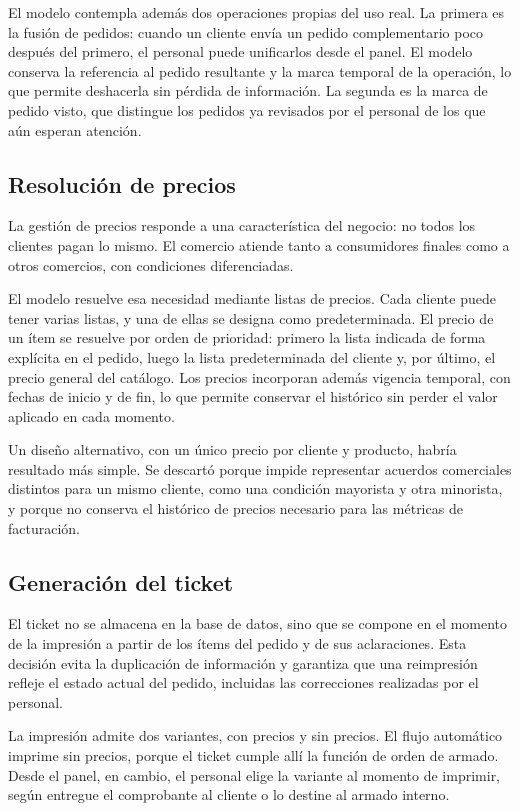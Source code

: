 El modelo contempla además dos operaciones propias del uso real. La primera es la fusión de pedidos: cuando un cliente envía un pedido complementario poco después del primero, el personal puede unificarlos desde el panel. El modelo conserva la referencia al pedido resultante y la marca temporal de la operación, lo que permite deshacerla sin pérdida de información. La segunda es la marca de pedido visto, que distingue los pedidos ya revisados por el personal de los que aún esperan atención.

\subsection{Resolución de precios}
\label{subsec:precios}

La gestión de precios responde a una característica del negocio: no todos los clientes pagan lo mismo. El comercio atiende tanto a consumidores finales como a otros comercios, con condiciones diferenciadas.

El modelo resuelve esa necesidad mediante listas de precios. Cada cliente puede tener varias listas, y una de ellas se designa como predeterminada. El precio de un ítem se resuelve por orden de prioridad: primero la lista indicada de forma explícita en el pedido, luego la lista predeterminada del cliente y, por último, el precio general del catálogo. Los precios incorporan además vigencia temporal, con fechas de inicio y de fin, lo que permite conservar el histórico sin perder el valor aplicado en cada momento.

Un diseño alternativo, con un único precio por cliente y producto, habría resultado más simple. Se descartó porque impide representar acuerdos comerciales distintos para un mismo cliente, como una condición mayorista y otra minorista, y porque no conserva el histórico de precios necesario para las métricas de facturación.

\subsection{Generación del ticket}
\label{subsec:ticket}

El ticket no se almacena en la base de datos, sino que se compone en el momento de la impresión a partir de los ítems del pedido y de sus aclaraciones. Esta decisión evita la duplicación de información y garantiza que una reimpresión refleje el estado actual del pedido, incluidas las correcciones realizadas por el personal.

La impresión admite dos variantes, con precios y sin precios. El flujo automático imprime sin precios, porque el ticket cumple allí la función de orden de armado. Desde el panel, en cambio, el personal elige la variante al momento de imprimir, según entregue el comprobante al cliente o lo destine al armado interno.

